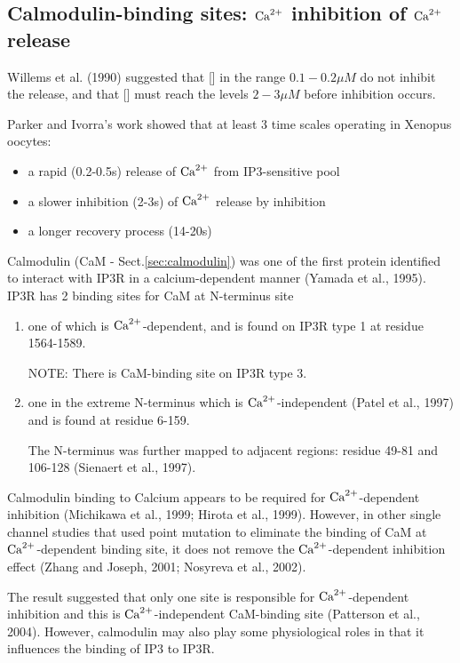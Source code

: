 \subsection{Calmodulin-binding sites: ${\text{Ca}^{2+}}$ inhibition of ${\text{Ca}^{2+}}$ release}
\label{sec:ceca2+-inhib-ceca2+}
\label{sec:IP3R-inhibition}

Willems et al. (1990) suggested that [] in the range
$0.1-0.2\mu M$ do not inhibit the release, and that [] must
reach the levels $2-3\mu M$ before inhibition occurs.

Parker and Ivorra's work showed that at least 3 time scales operating
in Xenopus oocytes: 
\begin{itemize}
\item a rapid (0.2-0.5s) release of ${\text{Ca}^{2+}}$ from IP3-sensitive pool

\item a slower inhibition (2-3s) of ${\text{Ca}^{2+}}$ release by 
  inhibition

\item a longer recovery process (14-20s)
\end{itemize}

Calmodulin (CaM - Sect.\ref{sec:calmodulin}) was one of the first protein
identified to interact with IP3R in a calcium-dependent manner (Yamada et al.,
1995). IP3R has 2 binding sites for CaM at N-terminus site
\begin{enumerate}
  \item one of which is ${\text{Ca}^{2+}}$-dependent, and is found on IP3R type 1 at residue
  1564-1589.
  
NOTE: There is CaM-binding site on IP3R type 3.
  
  \item one in the extreme N-terminus which is ${\text{Ca}^{2+}}$-independent (Patel et al.,
  1997) and is found at residue 6-159.
  
The N-terminus was further mapped to adjacent regions: residue 49-81 and 106-128
(Sienaert et al., 1997).


\end{enumerate}


Calmodulin binding to Calcium appears to be required for ${\text{Ca}^{2+}}$-dependent
inhibition (Michikawa et al., 1999; Hirota et al., 1999). However, in other
single channel studies that used point mutation to eliminate the binding of CaM
at ${\text{Ca}^{2+}}$-dependent binding site, it does not remove the ${\text{Ca}^{2+}}$-dependent
inhibition effect (Zhang and Joseph, 2001; Nosyreva et al., 2002).

The result suggested that only one site is responsible for ${\text{Ca}^{2+}}$-dependent
inhibition and this is ${\text{Ca}^{2+}}$-independent CaM-binding site (Patterson et al.,
2004). However, calmodulin may also play some physiological roles in that it
influences the binding of IP3 to IP3R. 

